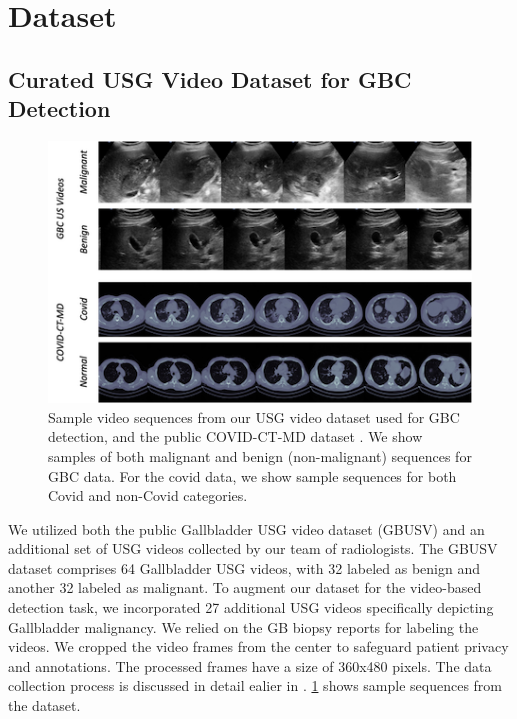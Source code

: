 
\section{Dataset }
%
\subsection{Curated USG Video Dataset for GBC Detection}
%
\begin{figure}[t]
    \centering
    \includegraphics[width=0.85\linewidth]{figs/focusmae/data_sample_med.png}
    \caption[Sample video sequences from the USG and CT datasets]{Sample video sequences from our USG video dataset used for GBC detection, and the public COVID-CT-MD dataset \cite{covidctmd}. We show samples of both malignant and benign (non-malignant) sequences for GBC data. For the covid data, we show sample sequences for both Covid and non-Covid categories.}
    \label{focusmae_fig:data_sample}
\end{figure}
%
We utilized both the public Gallbladder USG video dataset (GBUSV) \cite{basu2022unsupervised} and an additional set of USG videos collected by our team of radiologists. The GBUSV dataset comprises 64 Gallbladder USG videos, with 32 labeled as benign and another 32 labeled as malignant. To augment our dataset for the video-based \gbc detection task, we incorporated 27 additional USG videos specifically depicting Gallbladder malignancy. We relied on the GB biopsy reports for labeling the videos. We cropped the video frames from the center to safeguard patient privacy and annotations. The processed frames have a size of 360x480 pixels. The data collection process is discussed in detail ealier in . \cref{focusmae_fig:data_sample} shows sample sequences from the dataset. 


